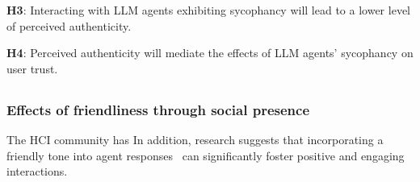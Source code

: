 
\vspace{2pt}
\textbf{H3}: Interacting with LLM agents exhibiting sycophancy will lead to a lower level of perceived authenticity.

\vspace{2pt}
\textbf{H4}: Perceived authenticity will mediate the effects of LLM agents' sycophancy on user trust. 

\subsection{}
\subsubsection{Effects of friendliness through social presence}
The HCI community has  In addition, research suggests that incorporating a friendly tone into agent responses~\cite{zhao2024tailoring} can significantly foster positive and engaging interactions. 

